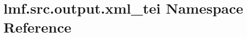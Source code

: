 \hypertarget{namespacelmf_1_1src_1_1output_1_1xml__tei}{\section{lmf.\+src.\+output.\+xml\+\_\+tei Namespace Reference}
\label{namespacelmf_1_1src_1_1output_1_1xml__tei}
}
